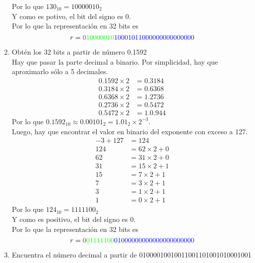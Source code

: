 \documentclass{article}
\begin{document}
\begin{enumerate}
{            Por lo que $130_{10} = 10000010_{2}$ \\
            Y como es potivo, el bit del signo es 0. \\
            Por lo que la representación en 32 bits es
            \[r = {\color{red}0}{\color{green}10000010}
            {\color{blue}10001011000000000000000}\]
        }
        \item {
            Obtén los 32 bits a partir de número 0.1592 \\
            Hay que pasar la parte decimal a binario. Por simplicidad, hay
            que aproximarlo sólo a 5 decimales.
            \begin{align*}
                0.1592 \times 2 &= 0.3184 \\
                0.3184 \times 2 &= 0.6368 \\
                0.6368 \times 2 &= 1.2736 \\
                0.2736 \times 2 &= 0.5472 \\
                0.5472 \times 2 &= 1.0.944
            \end{align*}
            Por lo que $0.1592_{10} \approx 0.00101_{2} 
            = 1.01_{2} \times 2 ^ {-3}$.\\
            Luego, hay que encontrar el valor en binario del exponente con exceso
            a 127.
            \begin{align*}
                -3 + 127 &= 124 \\
                124 &= 62 \times 2 + 0 \\
                62 &= 31 \times 2 + 0 \\
                31 &= 15 \times 2 + 1 \\
                15 &= 7 \times 2 + 1 \\
                7 &= 3 \times 2 + 1 \\
                3 &= 1 \times 2 + 1 \\
                1 &= 0 \times 2 + 1
            \end{align*}
            Por lo que $124_{10} = 1111100_{2}$ \\
            Y como es positivo, el bit del signo es 0. \\
            Por lo que la representación en 32 bits es
            \[r = {\color{red}0}{\color{green}01111100}
            {\color{blue}01000000000000000000000}\]
        }
        \item {
            Encuentra el número decimal a partir de 
            01000010010011001101001010001001\\
}
\end{enumerate}
\end{document}
